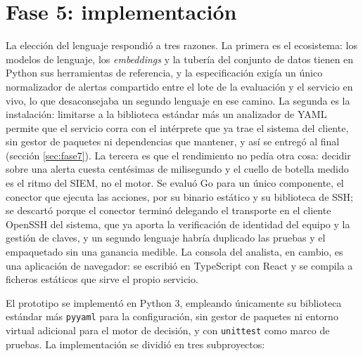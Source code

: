 \section{Fase 5: implementación}

La elección del lenguaje respondió a tres razones. La primera es el ecosistema: los modelos de
lenguaje, los \emph{embeddings} y la tubería del conjunto de datos tienen en Python sus herramientas de
referencia, y la especificación exigía un único normalizador de alertas compartido entre el lote de la
evaluación y el servicio en vivo, lo que desaconsejaba un segundo lenguaje en ese camino. La segunda
es la instalación: limitarse a la biblioteca estándar más un analizador de YAML permite que el
servicio corra con el intérprete que ya trae el sistema del cliente, sin gestor de paquetes ni
dependencias que mantener, y así se entregó al final (sección \ref{sec:fase7}). La tercera es que el
rendimiento no pedía otra cosa: decidir sobre una alerta cuesta centésimas de milisegundo y el cuello
de botella medido es el ritmo del SIEM, no el motor. Se evaluó Go para un único componente, el
conector que ejecuta las acciones, por su binario estático y su biblioteca de SSH; se descartó porque
el conector terminó delegando el transporte en el cliente OpenSSH del sistema, que ya aporta la
verificación de identidad del equipo y la gestión de claves, y un segundo lenguaje habría duplicado
las pruebas y el empaquetado sin una ganancia medible. La consola del analista, en cambio, es una
aplicación de navegador: se escribió en TypeScript con React y se compila a ficheros estáticos que
sirve el propio servicio.

El prototipo se implementó en Python 3, empleando únicamente su biblioteca estándar más
\texttt{pyyaml} para la configuración, sin gestor de paquetes ni entorno virtual adicional para el
motor de decisión, y con \texttt{unittest} como marco de pruebas. La implementación se dividió en
tres subproyectos:

